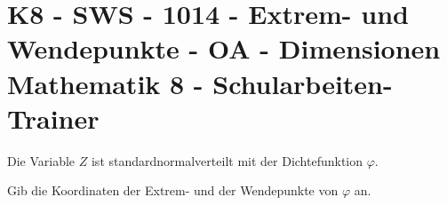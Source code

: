\section{K8 - SWS - 1014 - Extrem- und Wendepunkte - OA - Dimensionen Mathematik 8 - Schularbeiten-Trainer}

\begin{beispiel}[K8 - SWS]{1}
Die Variable $Z$ ist standardnormalverteilt mit der Dichtefunktion $\varphi$.

Gib die Koordinaten der Extrem- und der Wendepunkte von $\varphi$ an.

\end{beispiel}